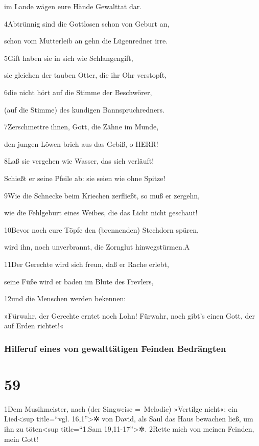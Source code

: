 im Lande wägen eure Hände Gewalttat dar.

4Abtrünnig sind die Gottlosen schon von Geburt an,

schon vom Mutterleib an gehn die Lügenredner irre.

5Gift haben sie in sich wie Schlangengift,

sie gleichen der tauben Otter, die ihr Ohr verstopft,

6die nicht hört auf die Stimme der Beschwörer,

(auf die Stimme) des kundigen Bannspruchredners.

7Zerschmettre ihnen, Gott, die Zähne im Munde,

den jungen Löwen brich aus das Gebiß, o HERR!

8Laß sie vergehen wie Wasser, das sich verläuft!

Schießt er seine Pfeile ab: sie seien wie ohne Spitze!

9Wie die Schnecke beim Kriechen zerfließt, so muß er zergehn,

wie die Fehlgeburt eines Weibes, die das Licht nicht geschaut!

10Bevor noch eure Töpfe den (brennenden) Stechdorn spüren,

wird ihn, noch unverbrannt, die Zornglut hinwegstürmen.{A}

11Der Gerechte wird sich freun, daß er Rache erlebt,

seine Füße wird er baden im Blute des Frevlers,

12und die Menschen werden bekennen:

»Fürwahr, der Gerechte erntet noch Lohn! Fürwahr, noch gibt's einen
Gott, der auf Erden richtet!«

\hypertarget{hilferuf-eines-von-gewalttuxe4tigen-feinden-bedruxe4ngten}{%
\subsubsection{Hilferuf eines von gewalttätigen Feinden
Bedrängten}\label{hilferuf-eines-von-gewalttuxe4tigen-feinden-bedruxe4ngten}}

\hypertarget{section-58}{%
\section{59}\label{section-58}}

1Dem Musikmeister, nach (der Singweise =~Melodie) »Vertilge nicht«; ein
Lied\textless sup title=``vgl. 16,1''\textgreater✲ von David, als Saul
das Haus bewachen ließ, um ihn zu töten\textless sup title=``1.Sam
19,11-17''\textgreater✲. 2Rette mich von meinen Feinden, mein Gott!

